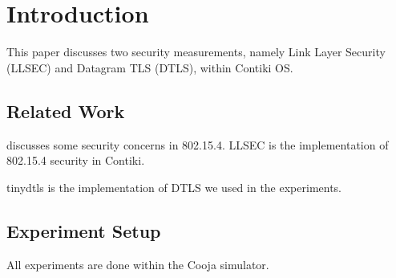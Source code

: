 \chapter{Introduction}
This paper discusses two security measurements, namely Link Layer Security (LLSEC) and Datagram TLS (DTLS), within Contiki OS.

\section{Related Work}
\cite{802154Sec} discusses some security concerns in 802.15.4.  LLSEC\cite{LLSEC} is the implementation of 802.15.4 security in Contiki.

tinydtls\cite{tinydtls} is the implementation of DTLS we used in the experiments.

\section{Experiment Setup}
All experiments are done within the Cooja simulator.